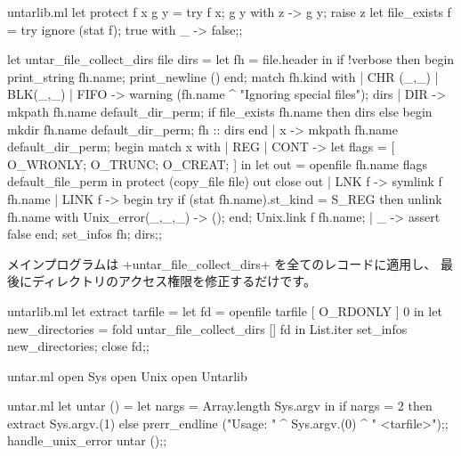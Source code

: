 \begin{answer}
\begin{listingcodefile}{untarlib.ml}
let protect f x g y = try f x; g y with z -> g y; raise z
let file_exists f = try ignore (stat f); true with _ -> false;;

let untar_file_collect_dirs file dirs =
  let fh = file.header in
  if !verbose then begin print_string fh.name; print_newline () end;
  match fh.kind with
  | CHR (_,_) | BLK(_,_) | FIFO ->
      warning (fh.name ^ "Ignoring special files");
      dirs
  | DIR ->
      mkpath fh.name default_dir_perm;
      if file_exists fh.name then dirs
      else begin mkdir fh.name default_dir_perm; fh :: dirs end
  | x ->
      mkpath fh.name default_dir_perm;
      begin match x with
      | REG | CONT ->
          let flags = [ O_WRONLY; O_TRUNC; O_CREAT; ] in
          let out = openfile fh.name flags default_file_perm in
          protect (copy_file file) out close out
      | LNK f ->
          symlink f fh.name
      | LINK f ->
          begin
            try if (stat fh.name).st_kind = S_REG then unlink fh.name
            with Unix_error(_,_,_) -> ();
          end;
          Unix.link f fh.name;
      | _ -> assert false
      end;
      set_infos fh;
      dirs;;
\end{listingcodefile}
メインプログラムは \ml+untar_file_collect_dirs+ を全てのレコードに適用し、
最後にディレクトリのアクセス権限を修正するだけです。
%
\begin{listingcodefile}{untarlib.ml}
let extract tarfile =
  let fd = openfile tarfile [ O_RDONLY ] 0 in
  let new_directories =
    fold untar_file_collect_dirs [] fd in
  List.iter set_infos new_directories;
  close fd;;
\end{listingcodefile}
%
\begin{codefile}{untar.ml}
open Sys
open Unix
open Untarlib
\end{codefile}
%
\begin{listingcodefile}{untar.ml}
let untar () =
  let nargs = Array.length Sys.argv in
  if nargs = 2 then extract Sys.argv.(1)
  else prerr_endline ("Usage: " ^ Sys.argv.(0) ^ " <tarfile>");;
handle_unix_error untar ();;
\end{listingcodefile}
\end{answer}

